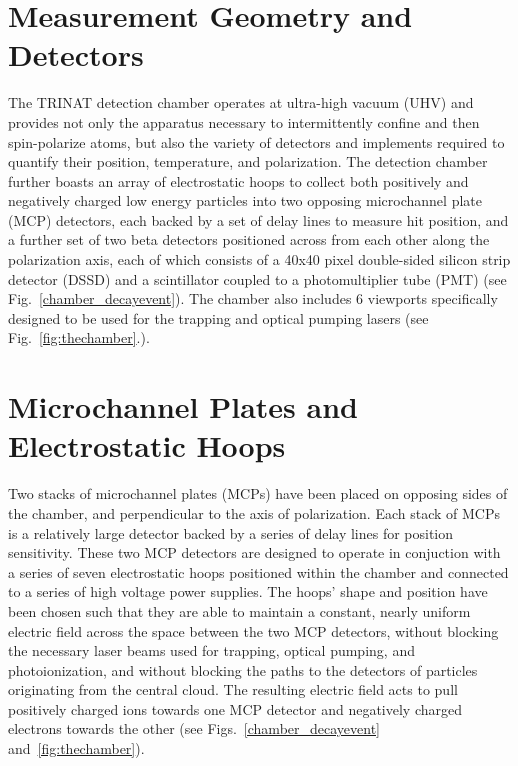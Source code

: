 \section{Measurement Geometry and Detectors}
\label{sec:geometry}
The TRINAT detection chamber operates at ultra-high vacuum (UHV) and provides not only the apparatus necessary to intermittently confine and then spin-polarize atoms, but also the variety of detectors and implements required to quantify their position, temperature, and polarization.  The detection chamber further boasts an array of electrostatic hoops to collect both positively and negatively charged low energy particles into two opposing microchannel plate (MCP) detectors, each backed by a set of delay lines to measure hit position, and a further set of two beta detectors positioned across from each other along the polarization axis, each of which consists of a 40x40 pixel double-sided silicon strip detector (DSSD) and a scintillator coupled to a photomultiplier tube (PMT) 
(see Fig.~\ref{chamber_decayevent}). The chamber also includes 6 viewports specifically designed to be used for the trapping and optical pumping lasers (see Fig.~\ref{fig:thechamber}.).

\section{Microchannel Plates and Electrostatic Hoops}
\label{section:mcps}
\label{section:field}
Two stacks of microchannel plates (MCPs) have been placed on opposing sides of the chamber, and perpendicular to the axis of polarization.  Each stack of MCPs is a relatively large detector backed by a series of delay lines for position sensitivity.  These two MCP detectors are designed to operate in conjuction with a series of seven electrostatic hoops positioned within the chamber and connected to a series of high voltage power supplies.  The hoops' shape and position have been chosen such that they are able to maintain  
a constant, nearly uniform electric field across the space between the two MCP detectors, without blocking the necessary laser beams used for trapping, optical pumping, and photoionization, and without blocking the paths to the detectors of particles originating from the central cloud.
The resulting electric field acts to pull positively charged ions towards one MCP detector and negatively charged electrons towards the other (see Figs.~\ref{chamber_decayevent} and~\ref{fig:thechamber}).  

